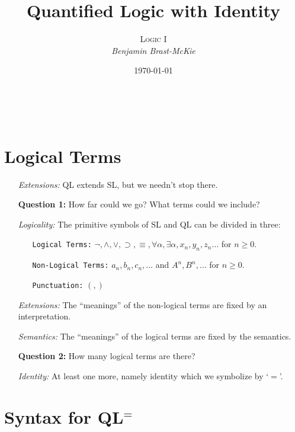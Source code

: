 \documentclass[a4paper, 11pt]{article} %
\title{\textbf{Quantified Logic with Identity}} %
\author{\textsc{Logic I}\\ \em Benjamin Brast-McKie} %
\date{\today} %
\makeatletter
\renewcommand{\maketitle}{ %
\begin{flushright} %
{\LARGE\@title} %

\vspace{10pt} %

{\@author} %
\\\@date %

\vspace{0pt} %
\end{flushright}
}
\makeatother
\begin{document}
\maketitle %

\thispagestyle{empty}


\section*{Logical Terms}

\begin{enumerate}
  \item[\it Extensions:] QL extends SL, but we needn't stop there.
  \item[\bf Question 1:] How far could we go? What terms could we include?
  \item[\it Logicality:] The primitive symbols of SL and QL can be divided in three:
    \begin{itemize}
      \item[\tt Logical Terms:] $\neg,\wedge,\vee,\supset,\equiv,\forall\alpha,\exists\alpha,x_n,y_n,z_n\ldots$ for $n\geq 0$.
      \item[\tt Non-Logical Terms:] $a_n,b_n,c_n,\ldots$ and $A^n,B^n,\ldots$ for $n\geq 0$.
      \item[\tt Punctuation:] $(, )$
    \end{itemize}
  \item[\it Extensions:] The ``meanings'' of the non-logical terms are fixed by an interpretation.
  \item[\it Semantics:] The ``meanings'' of the logical terms are fixed by the semantics.
  \item[\bf Question 2:] How many logical terms are there?
  \item[\it Identity:] At least one more, namely identity which we symbolize by `$=$'.
\end{enumerate}





\section*{Syntax for QL$^=$}
\end{document}
